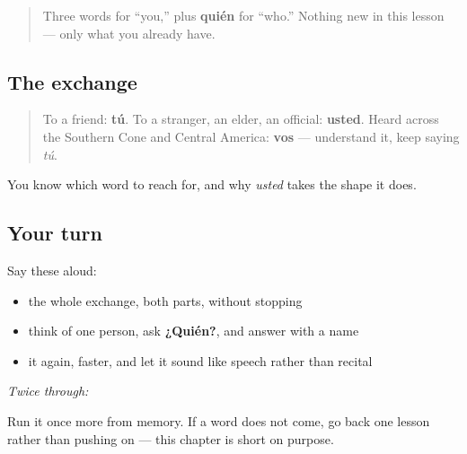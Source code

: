 \label{lesson:ES-C03-repaso-tu-usted}



\begin{quote}
Three words for “you,” plus \textbf{quién} for “who.” Nothing new in this lesson — only what you already have.
\end{quote}

\subsection*{The exchange}
\begin{quote}
To a friend: \textbf{tú}. To a stranger, an elder, an official: \textbf{usted}. Heard across the Southern Cone and Central America: \textbf{vos} — understand it, keep saying \emph{tú}.
\end{quote}

\begin{grammarlens}[title={What you've built}]
You know which word to reach for, and why \emph{usted} takes the shape it does.
\end{grammarlens}

\subsection*{Your turn}
Say these aloud:

\begin{itemize}
\raggedright
  \item the whole exchange, both parts, without stopping
  \item think of one person, ask \textbf{¿Quién?}, and answer with a name
  \item it again, faster, and let it sound like speech rather than recital
\end{itemize}

\emph{Twice through:}

\begin{tcolorbox}[breakable,colback=teal!4,colframe=teal!35!black,title={Before you move on}]
Run it once more from memory. If a word does not come, go back one lesson rather than pushing on — this chapter is short on purpose.
\end{tcolorbox}
